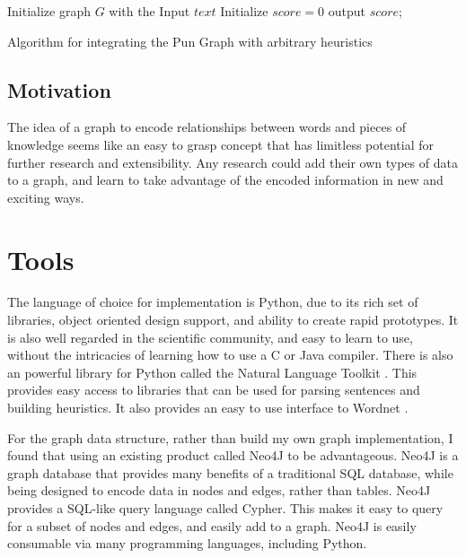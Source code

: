 \begin{algorithm}[h]
\begin{mdframed}
 Initialize graph $G$ with the Input $text$\;
 Initialize $score = 0$\;
  output $score$;
   \end{mdframed}
   \caption{Algorithm for integrating the Pun Graph with arbitrary heuristics}
 \label{graphalgorithm}
\end{algorithm}

\subsection{Motivation}
The idea of a graph to encode relationships between words and pieces of knowledge seems like an easy to grasp concept that has limitless potential for further research and extensibility. Any research could add their own types of data to a graph, and learn to take advantage of the encoded information in new and exciting ways.  

\section{Tools}
The language of choice for implementation is Python, due to its rich set of libraries, object oriented design support, and ability to create rapid prototypes. It is also well regarded in the scientific community, and easy to learn to use, without the intricacies of learning how to use a C or Java compiler. There is also an powerful library for Python called the Natural Language Toolkit \cite{NLTK}. This provides easy access to libraries that can be used for parsing sentences and building heuristics. It also provides an easy to use interface to Wordnet \cite{wordnet}.

For the graph data structure, rather than build my own graph implementation, I found that using an existing product called Neo4J to be advantageous. Neo4J \cite{neo4j} is a graph database that provides many benefits of a traditional SQL database, while being designed to encode data in nodes and edges, rather than tables. Neo4J provides a SQL-like query language called Cypher. This makes it easy to query for a subset of nodes and edges, and easily add to a graph. Neo4J is easily consumable via many programming languages, including Python.

